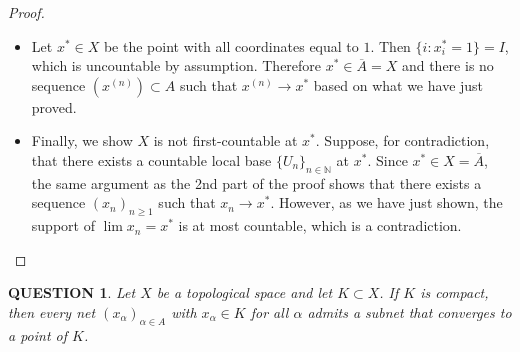 \documentclass[12pt]{article}
\renewcommand{\(}{\left(}%
\renewcommand{\)}{\right)}%
\renewcommand{\[}{\left[}%
\renewcommand{\]}{\right]}%
\newtheorem{question}{QUESTION}[section]}
\newtheorem{proof}{Proof.}}
\begin{document}
\begin{proof}
\begin{itemize}
\begin{itemize}
Let $T := \{ i\in I : x_i = 1 \}$ be the support of $x$. The above shows $T \subset S$, so $T$ is at most countable. 
	\item Let $x^\ast\in X$ be the point with all coordinates equal to $1$. Then $\{i : x^\ast_i = 1\} = I$, which is uncountable by assumption. Therefore $x^\ast\in \overline{A}=X$ and there is no sequence $(x^{(n)})\subset A$ such that $x^{(n)}\to x^\ast$ based on what we have just proved.
	\item Finally, we show $X$ is not first-countable at $x^*$. Suppose, for contradiction, that there exists a countable local base $\{U_n\}_{n\in\mathbb{N}}$ at $x^\ast$. Since $x^*\in X=\overline{A}$, the same argument as the 2nd part of the proof shows that there exists a sequence $(x_n)_{n\geq 1}$ such that $x_n\to x^*$. However, as we have just shown, the support of $\lim x_n=x^*$ is at most countable, which is a contradiction.
\end{itemize}
	\end{itemize}
\end{proof}

\begin{question}
	Let $X$ be a topological space and let $K\subset X$. If $K$ is compact, then every net $(x_\alpha)_{\alpha\in A}$ with $x_\alpha\in K$ for all $\alpha$ admits a subnet that converges to a point of $K$.
\end{question}
\end{document}
